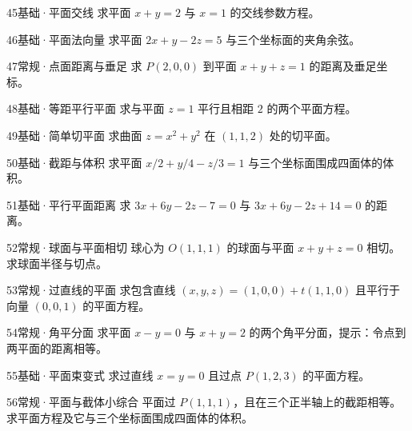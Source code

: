 \begin{exercise}{45}{基础·平面交线}
求平面 $x+y=2$ 与 $x=1$ 的交线参数方程。
\end{exercise}
\begin{exercise}{46}{基础·平面法向量}
求平面 $2x+y-2z=5$ 与三个坐标面的夹角余弦。
\end{exercise}
\begin{exercise}{47}{常规·点面距离与垂足}
求 $P(2,0,0)$ 到平面 $x+y+z=1$ 的距离及垂足坐标。
\end{exercise}
\begin{exercise}{48}{基础·等距平行平面}
求与平面 $z=1$ 平行且相距 $2$ 的两个平面方程。
\end{exercise}
\begin{exercise}{49}{基础·简单切平面}
求曲面 $z=x^2+y^2$ 在 $(1,1,2)$ 处的切平面。
\end{exercise}
\begin{exercise}{50}{基础·截距与体积}
求平面 $x/2+y/4-z/3=1$ 与三个坐标面围成四面体的体积。
\end{exercise}
\begin{exercise}{51}{基础·平行平面距离}
求 $3x+6y-2z-7=0$ 与 $3x+6y-2z+14=0$ 的距离。
\end{exercise}
\begin{exercise}{52}{常规·球面与平面相切}
球心为 $O(1,1,1)$ 的球面与平面 $x+y+z=0$ 相切。求球面半径与切点。
\end{exercise}
\begin{exercise}{53}{常规·过直线的平面}
求包含直线 $(x,y,z)=(1,0,0)+t(1,1,0)$ 且平行于向量 $(0,0,1)$ 的平面方程。
\end{exercise}
\begin{exercise}{54}{常规·角平分面}
求平面 $x-y=0$ 与 $x+y=2$ 的两个角平分面，提示：令点到两平面的距离相等。
\end{exercise}
\begin{exercise}{55}{基础·平面束变式}
求过直线 $x=y=0$ 且过点 $P(1,2,3)$ 的平面方程。
\end{exercise}
\begin{exercise}{56}{常规·平面与截体小综合}
平面过 $P(1,1,1)$，且在三个正半轴上的截距相等。求平面方程及它与三个坐标面围成四面体的体积。
\end{exercise}
